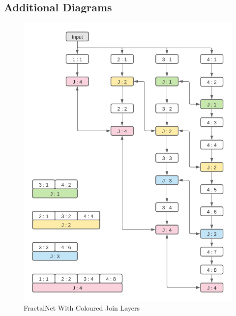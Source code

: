 \begin{appendices}
\chapter{Additional Diagrams}
\thispagestyle{fancy} %
\begin{figure}[H]
  \begin{center}
    \includegraphics[scale=0.7]{Images/fractalColumnsCollapsedColoured}
    \caption{FractalNet With Coloured Join Layers}
    \label{fig:fractal_net_coloured}
  \end{center}
\end{figure}
\begin{figure}[H]
  \begin{center}

\end{center}
\end{figure}
\end{appendices}
